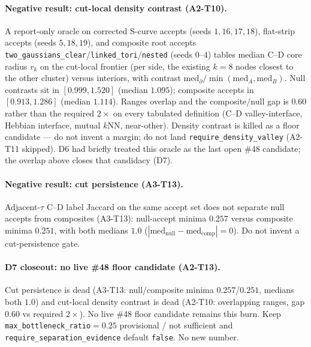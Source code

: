 \documentclass[11pt]{article}
\begin{document}
\paragraph{Negative result: cut-local density contrast (A2-T10).}
\label{par:si-density-contrast-kill}
A report-only oracle on corrected S-curve accepts (seeds $1,16,17,18$),
flat-strip accepts (seeds $5,18,19$), and composite root accepts
\texttt{two\_gaussians\_clear}/\texttt{linked\_tori}/\texttt{nested}
(seeds $0$--$4$) tables median C--D core radius $r_k$ on the cut-local
frontier (per side, the existing $k{=}8$ nodes closest to the other
cluster) versus interiors, with contrast
$\mathrm{med}_{\partial}/\min(\mathrm{med}_A,\mathrm{med}_B)$.
Null contrasts sit in $[0.999,1.520]$ (median $1.095$); composite
accepts in $[0.913,1.286]$ (median $1.114$). Ranges overlap and the
composite/null gap is $0.60$ rather than the required $2\times$ on every
tabulated definition (C--D valley-interface, Hebbian interface, mutual
$k$NN, near-other). Density contrast is killed as a floor candidate ---
do not invent a margin; do not land \texttt{require\_density\_valley}
(A2-T11 skipped). D6 had briefly treated this oracle as the last open
\#48 candidate; the overlap above closes that candidacy (D7).

\paragraph{Negative result: cut persistence (A3-T13).}
\label{par:si-cut-persistence-kill}
Adjacent-$\tau$ C--D label Jaccard on the same accept set does not
separate null accepts from composites (A3-T13): null-accept minima
$0.257$ versus composite minima $0.251$, with both medians $1.0$
($|\mathrm{med}_{\mathrm{null}}-\mathrm{med}_{\mathrm{comp}}|{=}0$).
Do not invent a cut-persistence gate.

\paragraph{D7 closeout: no live \#48 floor candidate (A2-T13).}
\label{par:si-d7-no-live-floor}
Cut persistence is dead (A3-T13: null/composite minima $0.257$/$0.251$,
medians both $1.0$) and cut-local density contrast is dead (A2-T10:
overlapping ranges, gap $0.60$ vs required $2\times$). No live \#48
floor candidate remains this burn. Keep
\texttt{max\_bottleneck\_ratio}${}=0.25$ provisional / not sufficient
and \texttt{require\_separation\_evidence} default \texttt{false}. No
new number.
\end{document}
